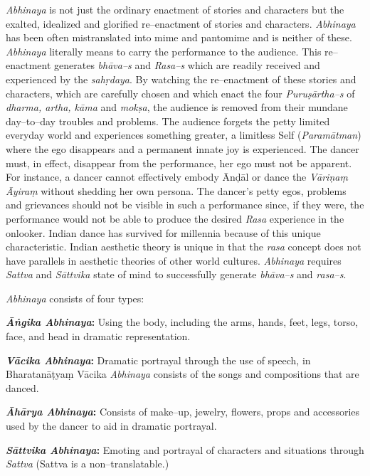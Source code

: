 \textit{Abhinaya} is not just the ordinary enactment of stories and characters but the exalted, idealized and glorified re–enactment of stories and characters. \textit{Abhinaya} has been often mistranslated into mime and pantomime and is neither of these. \textit{Abhinaya} literally means to carry the performance to the audience. This re–enactment generates \textit{bhāva–s} and \textit{Rasa–s} which are readily received and experienced by the \textit{sahṛdaya}. By watching the re–enactment of these stories and characters, which are carefully chosen and which enact the four \textit{Puruṣārtha–s} of \textit{dharma, artha, kāma} and \textit{mokṣa}, the audience is removed from their mundane day–to–day troubles and problems. The audience forgets the petty limited everyday world and experiences something greater, a limitless Self (\textit{Paramātman}) where the ego disappears and a permanent innate joy is experienced. The dancer must, in effect, disappear from the performance, her ego must not be apparent. For instance, a dancer cannot effectively embody Ānḍāl or dance the \textit{Vāriṇaṃ Āyiraṃ }without shedding her own persona. The dancer’s petty egos, problems and grievances should not be visible in such a performance since, if they were, the performance would not be able to produce the desired \textit{Rasa} experience in the onlooker. Indian dance has survived for millennia because of this unique characteristic. Indian aesthetic theory is unique in that the \textit{rasa} concept does not have parallels in aesthetic theories of other world cultures. \textit{Abhinaya} requires \textit{Sattva} and \textit{Sāttvika} state of mind to successfully generate \textit{bhāva–s} and \textit{rasa–s}.

\textit{Abhinaya} consists of four types:

\textbf{\textit{Āṅgika Abhinaya}:} Using the body, including the arms, hands, feet, legs, torso, face, and head in dramatic representation.

\textbf{\textit{Vācika Abhinaya}:} Dramatic portrayal through the use of speech, in Bharatanāṭyaṃ Vācika \textit{Abhinaya} consists of the songs and compositions that are danced.

\textbf{\textit{Āhārya Abhinaya}:} Consists of make–up, jewelry, flowers, props and accessories used by the dancer to aid in dramatic portrayal.

\textbf{\textit{Sāttvika Abhinaya}:} Emoting and portrayal of characters and situations through \textit{Sattva} (Sattva is a non–translatable.)

